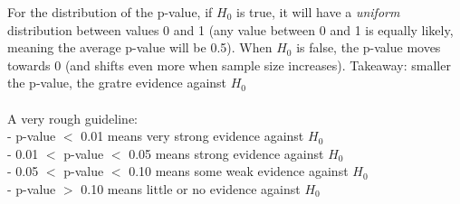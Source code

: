 \documentclass[12pt, a4paper]{article}
\begin{document}
		For the distribution of the p-value, if $H_0$ is true, it will have a \textit{uniform} distribution between values 0 and 1 (any value between 0 and 1 is equally likely, meaning the average p-value will be 0.5). When $H_0$ is false, the p-value moves towards 0 (and shifts even more when sample size increases). Takeaway: smaller the p-value, the gratre evidence against $H_0$ \\~\\
		A very rough guideline: \\
		- p-value $<$ 0.01 means very strong evidence against $H_0$ \\
		- 0.01 $<$ p-value $<$ 0.05 means strong evidence against $H_0$ \\
		- 0.05 $<$ p-value $<$ 0.10 means some weak evidence against $H_0$ \\
		- p-value $>$ 0.10 means little or no evidence against $H_0$ \\~\\
		
\end{document}
